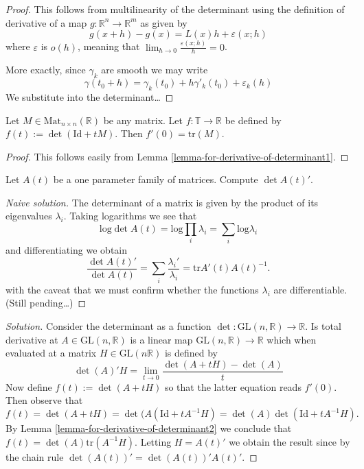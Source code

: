 \begin{proof}
This follows from multilinearity of the
determinant using the definition of
derivative of a map $g:\mathbb{R}^n \to
\mathbb{R}^m$ as given by
$$
g(x+h)-g(x)=L(x)h+\varepsilon(x;h)
$$
where $\varepsilon$ is $o(h)$, meaning that
$\lim_{h \to 0}
\frac{\varepsilon(x;h)}{h}=0$.

More exactly, since $\gamma_k$ are smooth we
may write
$$
\gamma(t_0+h)=\gamma_k(t_0)+h\gamma'_k(t_0)+
\varepsilon_k(h)
$$
We substitute into the determinant…
\end{proof}

\begin{lemma}
\label{lemma-for-derivative-of-determinant2}
Let $M \in \text{Mat}_{n\times
n}(\mathbb{R})$ be any matrix. Let
$f:\mathbb{T}\to \mathbb{R}$ be defined by
$f(t):=\det(\text{Id}+tM)$. Then
$f'(0)=\text{tr}(M)$.
\end{lemma}

\begin{proof}
This follows easily from Lemma
\ref{lemma-for-derivative-of-determinant1}.
\end{proof}

\begin{exercise}
\label{exercise-derivative-of-determinant}
Let $A(t)$ be a one parameter family of
matrices. Compute $\det A(t)'$.
\end{exercise}

\begin{proof}[Naive solution]
The determinant of a matrix is given by the
product of its eigenvalues
$\lambda_i$. Taking logarithms we see that
$$
\text{log}\det
A(t)=\text{log}\prod_{i}\lambda_i=\sum_{i}
\text{log}\lambda_i
$$
and differentiating we obtain
$$
\frac{\det A(t)'}{\det A(t)}=\sum_i
\frac{\lambda_i'}{\lambda_i}
=\text{tr} A'(t)A(t)^{-1}.
$$
with the caveat that we must confirm whether
the functions $\lambda_i$ are
differentiable. (Still pending…)
\end{proof}

\begin{proof}[Solution]
Consider the determinant as a function
$\det:\text{GL}(n,\mathbb{R})\to\mathbb{R}$.
Is total derivative at
$A \in \text{GL}(n,\mathbb{R})$ is a linear
map
$\text{GL}(n,\mathbb{R})\to \mathbb{R}$ which
when evaluated at a matrix
$H\in\text{GL}(n\mathbb{R})$ is defined by
$$
\det(A)'H=\lim_{t\to0}\frac{\det(A+tH)-
\det(A)}{t}
$$
Now define $f(t):=\det(A+tH)$ so that the
latter equation reads $f'(0)$. Then
observe that
$$
f(t)=\det(A+tH)=\det(A(\text{Id}+tA^{-1}H)=
\det(A)\det(\text{Id}+tA^{-1}H).
$$
By Lemma
\ref{lemma-for-derivative-of-determinant2} we
conclude that
$f(t)=\det(A)\text{tr}(A^{-1}H)$. Letting
$H=A(t)'$ we obtain the result since
by the chain rule
$\det(A(t))'=\det(A(t))'A(t)'$.
\end{proof}

